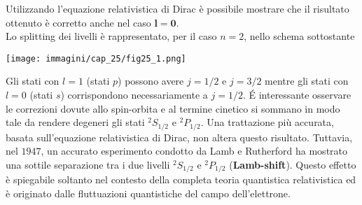Utilizzando l'equazione relativistica di Dirac è possibile mostrare che il risultato ottenuto è corretto anche nel caso \textbf{$\boldsymbol{l=0}$}. \\

Lo splitting dei livelli è rappresentato, per il caso $n=2$, nello schema sottostante\\
\begin{center}
\begin{tcolorbox}[width=.9\textwidth ,sharp corners= downhill, colframe=black, colback=white]
\texttt{[image: immagini/cap\_25/fig25\_1.png]}
\end{tcolorbox}
\end{center}

Gli stati con $l=1$ (stati $p$) possono avere $j=1/2$ e $j=3/2$ mentre gli stati con $l=0$ (stati $s$) corrispondono necessariamente a $j=1/2$. \'E interessante osservare le correzioni dovute allo spin-orbita e al termine cinetico si sommano in modo tale da rendere degeneri gli stati $^2S_{1/2}$ e $^2P_{1/2}$.
Una trattazione più accurata, basata sull'equazione relativistica di Dirac, non altera questo risultato. Tuttavia, nel $1947$, un accurato esperimento condotto da Lamb e Rutherford ha mostrato una sottile separazione tra i due livelli $^2S_{1/2}$ e $^2P_{1/2}$ (\textbf{Lamb-shift}). Questo effetto è spiegabile soltanto nel contesto della completa teoria quantistica relativistica ed è originato dalle fluttuazioni quantistiche del campo dell'elettrone.
